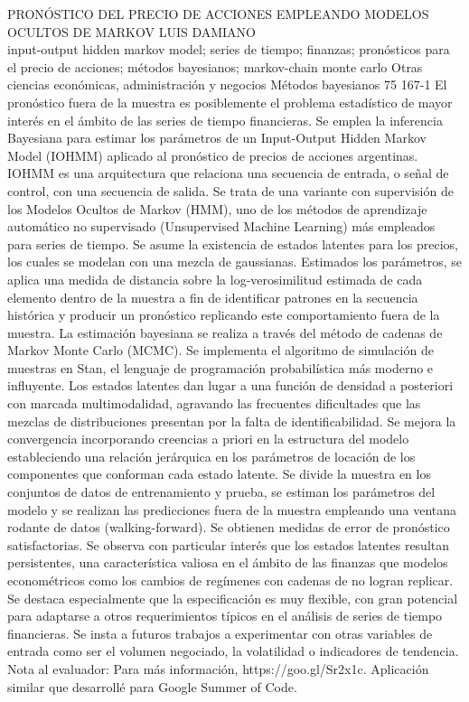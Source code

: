 \A
{PRONÓSTICO DEL PRECIO DE ACCIONES EMPLEANDO MODELOS OCULTOS DE MARKOV}
{LUIS DAMIANO}
{
\\
}
{input-output hidden markov model; series de tiempo; finanzas; pronósticos para el precio de acciones; métodos bayesianos; markov-chain monte carlo} 
 {Otras ciencias económicas, administración y negocios} 
 {Métodos bayesianos} 
 {75} 
 {167-1}
{El pronóstico fuera de la muestra es posiblemente el problema estadístico de mayor interés en el ámbito de las series de tiempo financieras. Se emplea la inferencia Bayesiana para estimar los parámetros de un Input-Output Hidden Markov Model (IOHMM) aplicado al pronóstico de precios de acciones argentinas. IOHMM es una arquitectura que relaciona una secuencia de entrada, o señal de control, con una secuencia de salida. Se trata de una variante con supervisión de los Modelos Ocultos de Markov (HMM), uno de los métodos de aprendizaje automático no supervisado (Unsupervised Machine Learning) más empleados para series de tiempo. Se asume la existencia de estados latentes para los precios, los cuales se modelan con una mezcla de gaussianas. Estimados los parámetros, se aplica una medida de distancia sobre la log-verosimilitud estimada de cada elemento dentro de la muestra a fin de identificar patrones en la secuencia histórica y producir un pronóstico replicando este comportamiento fuera de la muestra. La estimación bayesiana se realiza a través del método de cadenas de Markov Monte Carlo (MCMC). Se implementa el algoritmo de simulación de muestras en Stan, el lenguaje de programación probabilística más moderno e influyente. Los estados latentes dan lugar a una función de densidad a posteriori con marcada multimodalidad, agravando las frecuentes dificultades que las mezclas de distribuciones presentan por la falta de identificabilidad. Se mejora la convergencia incorporando creencias a priori en la estructura del modelo estableciendo una relación jerárquica en los parámetros de locación de los componentes que conforman cada estado latente. Se divide la muestra en los conjuntos de datos de entrenamiento y prueba, se estiman los parámetros del modelo y se realizan las predicciones fuera de la muestra empleando una ventana rodante de datos (walking-forward). Se obtienen medidas de error de pronóstico satisfactorias. Se observa con particular interés que los estados latentes resultan persistentes, una característica valiosa en el ámbito de las finanzas que modelos econométricos como los cambios de regímenes con cadenas de no logran replicar. Se destaca especialmente que la especificación es muy flexible, con gran potencial para adaptarse a otros requerimientos típicos en el análisis de series de tiempo financieras. Se insta a futuros trabajos a experimentar con otras variables de entrada como ser el volumen negociado, la volatilidad o indicadores de tendencia. Nota al evaluador: Para más información, https://goo.gl/Sr2x1c. Aplicación similar que desarrollé para Google Summer of Code.}
